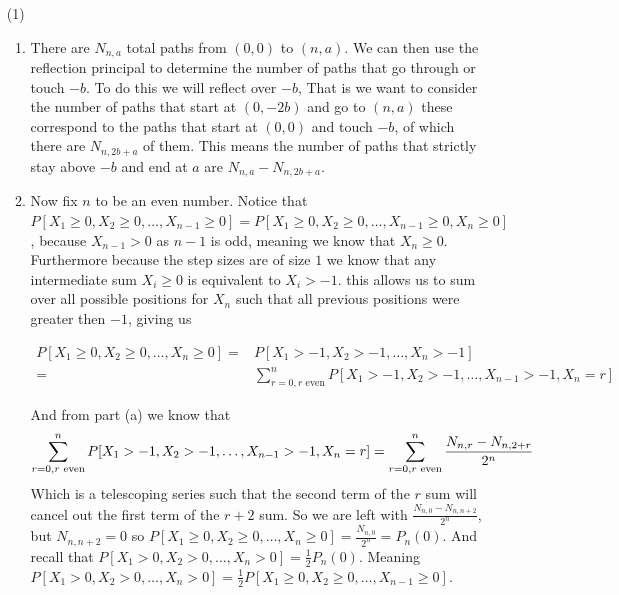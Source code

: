 \documentclass[12pt]{amsart}
\theoremstyle{definition}
\begin{document}
\begin{itemize}
\item[(1)] 
\begin{enumerate}[label=(\alph*)]
    \item There are $N_{n,a}$ total paths from $(0,0)$ to $(n,a)$. We can then use the reflection principal to determine the number of paths that go through or touch $-b$. To do this we will reflect over $-b$, That is we want to consider the number of paths that start at $(0,-2b)$ and go to $(n,a)$ these correspond to the paths that start at $(0,0)$ and touch $-b$, of which there are $N_{n,2b+a}$ of them. This means the number of paths that strictly stay above $-b$ and end at $a$ are $N_{n,a}-N_{n,2b+a}$.\\

    \item Now fix $n$ to be an even number. Notice that $P[X_1\geq 0, X_2\geq 0,\dots, X_{n-1}\geq 0]=P[X_1\geq 0, X_2\geq 0,\dots, X_{n-1}\geq 0, X_{n}\geq 0]$, because $X_{n-1}>0$ as $n-1$ is odd, meaning we know that $X_{n}\geq 0$. Furthermore because the step sizes are of size $1$ we know that any intermediate sum $X_i\geq 0$ is equivalent to $X_i>-1$. this allows us to sum over all possible positions for $X_n$ such that all previous positions were greater then $-1$, giving us

    \begin{align*}
        P[X_1\geq 0, X_2\geq 0,\dots, X_{n}\geq 0]=&P[X_1> -1, X_2>-1,\dots, X_{n}>-1]\\
        =&\sum_{r=0, r\text{ even}}^n P[X_1> -1, X_2>-1,\dots, X_{n-1}>-1, X_{n}= r]
    \end{align*}
    
    And from part (a) we know that 
    $$\sum_{r=0, r\text{ even}}^n P[X_1> -1, X_2>-1,\dots, X_{n-1}>-1, X_{n}= r]=\sum_{r=0,\\ r\text{ even}}^n \frac{N_{n,r}-N_{n,2+r}}{2^n}$$
    Which is a telescoping series such that the second term of the $r$ sum will cancel out the first term of the $r+2$ sum. So we are left with $\frac{N_{n,0}-N_{n,n+2}}{2^n}$, but $N_{n,n+2}=0$ so $P[X_1\geq 0, X_2\geq 0,\dots, X_{n}\geq 0]=\frac{N_{n,0}}{2^n}=P_n(0)$. And recall that $P[X_1> 0, X_2> 0,\dots, X_{n}> 0]=\frac{1}{2}P_n(0)$. Meaning $P[X_1> 0, X_2> 0,\dots, X_{n}> 0]=\frac{1}{2}P[X_1\geq 0, X_2\geq 0,\dots, X_{n-1}\geq 0]$.\\

    
\end{enumerate}


\end{itemize}
\end{document}
